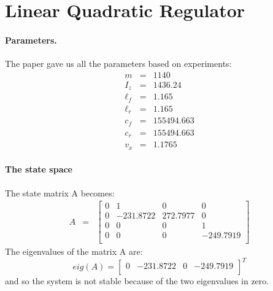 \documentclass{article}
\begin{document}
\section{Linear Quadratic Regulator}
\paragraph{Parameters.} The paper gave us all the parameters based on experiments:
\begin{eqnarray*}
	m &=& 1140 \\ 
	I_z &=& 1436.24\\ 
	\ell_f &=& 1.165 \\
	\ell_r &=& 1.165 \\
	c_f &=& 155494.663 \\
	c_r &=& 155494.663 \\
	v_x &=& 1.1765
\end{eqnarray*}
\paragraph{The state space}
The state matrix A becomes:
\begin{eqnarray}
 A &=& 
 \begin{bmatrix} 
 	0 & 1 & 0 & 0 \\
 	0 & -231.8722 & 272.7977 & 0\\
 	0 & 0 & 0 & 1 \\
 	0 & 0 & 0 & -249.7919\\
 \end{bmatrix}
 \end{eqnarray}
 The eigenvalues of the matrix A are:
 \begin{equation}
 	eig(A) = \begin{bmatrix} 
 	0 & -231.8722 & 0 & -249.7919 \\
 \end{bmatrix}^T \end{equation}
and so the system is not stable because of the two eigenvalues in zero.
\end{document}
